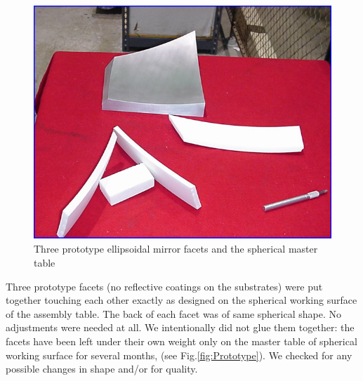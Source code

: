 \begin{figure}[h]
    \centering
    \includegraphics[width=1.0\linewidth]{Proto_4parts.png}
    \caption{Three prototype ellipsoidal mirror facets and the spherical master table}
    \label{fig:Proto_4parts}
\end{figure}{}
Three prototype facets (no reflective coatings on the substrates) were put together touching each other exactly as designed on the spherical working surface of the assembly table. The back of each facet was of same spherical shape. No adjustments were needed at all. We intentionally did not glue them together: the facets have been left under their own weight only on the master table of spherical working surface for several months, (see Fig.\ref{fig:Prototype}). We checked for any possible changes in shape and/or for quality.

